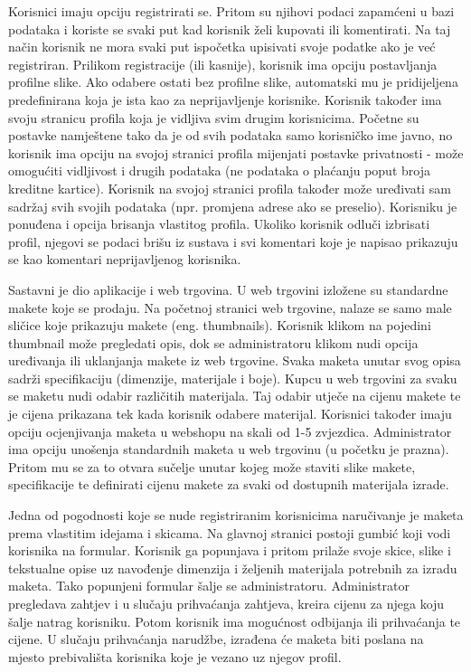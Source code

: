 		Korisnici imaju opciju registrirati se. Pritom su njihovi podaci zapamćeni u bazi podataka i koriste se svaki put kad korisnik želi kupovati ili komentirati. Na taj način korisnik ne mora svaki put ispočetka upisivati svoje podatke ako je već registriran. Prilikom registracije (ili kasnije), korisnik ima opciju postavljanja profilne slike. Ako odabere ostati bez profilne slike, automatski mu je pridijeljena predefinirana koja je ista kao za neprijavljenje korisnike. Korisnik također ima svoju stranicu profila koja je vidljiva svim drugim korisnicima. Početne su postavke namještene tako da je od svih podataka samo korisničko ime javno, no korisnik ima opciju na svojoj stranici profila mijenjati postavke privatnosti - može omogućiti vidljivost i drugih podataka (ne podataka o plaćanju poput broja kreditne kartice). Korisnik na svojoj stranici profila također može uređivati sam sadržaj svih svojih podataka (npr. promjena adrese ako se preselio). Korisniku je ponuđena i opcija brisanja vlastitog profila. Ukoliko korisnik odluči izbrisati profil, njegovi se podaci brišu iz sustava i svi komentari koje je napisao prikazuju se kao komentari neprijavljenog korisnika.
		
		Sastavni je dio aplikacije i web trgovina. U web trgovini izložene su standardne makete koje se prodaju. Na početnoj stranici web trgovine, nalaze se samo male sličice koje prikazuju makete (eng. thumbnails). Korisnik klikom na pojedini thumbnail može pregledati opis, dok se administratoru klikom nudi opcija uređivanja ili uklanjanja makete iz web trgovine. Svaka maketa unutar svog opisa sadrži specifikaciju (dimenzije, materijale i boje). Kupcu u web trgovini za svaku se maketu nudi odabir različitih materijala. Taj odabir utječe na cijenu makete te je cijena prikazana tek kada korisnik odabere materijal. Korisnici također imaju opciju ocjenjivanja maketa u webshopu na skali od 1-5 zvjezdica. Administrator ima opciju unošenja standardnih maketa u web trgovinu (u početku je prazna). Pritom mu se za to otvara sučelje unutar kojeg može staviti slike makete, specifikacije te definirati cijenu makete za svaki od dostupnih materijala izrade.
		
		Jedna od pogodnosti koje se nude registriranim korisnicima naručivanje je maketa prema vlastitim idejama i skicama. Na glavnoj stranici postoji gumbić koji vodi korisnika na formular. Korisnik ga popunjava i pritom prilaže svoje skice, slike i tekstualne opise uz navođenje dimenzija i željenih materijala potrebnih za izradu maketa. Tako popunjeni formular šalje se administratoru. Administrator pregledava zahtjev i u slučaju prihvaćanja zahtjeva, kreira cijenu za njega koju šalje natrag korisniku. Potom korisnik ima mogućnost odbijanja ili prihvaćanja te cijene. U slučaju prihvaćanja narudžbe, izrađena će maketa biti poslana na mjesto prebivališta korisnika koje je vezano uz njegov profil.
		
